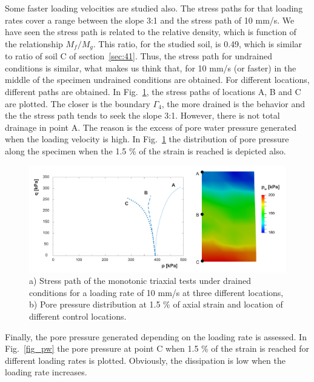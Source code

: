 \documentclass[preprint,12pt,a4paper]{elsarticle}
\begin{document}
Some faster loading velocities are studied also. The stress paths for that loading rates cover a range between the slope 3:1 and the stress path of 10 mm/s. We have seen the stress path is related to the relative density, which is function of the relationship $M_f/M_g$. This ratio, for the studied soil, is 0.49, which is similar to ratio of soil C of section~\ref{sec:41}. Thus, the stress path for undrained conditions is similar, what makes us think that, for 10 mm/s (or faster) in the middle of the specimen undrained conditions are obtained. For different locations, different paths are obtained. In Fig.~\ref{fig_drained_abc}, the stress paths of locations A, B and C are plotted. The closer is the boundary  $\Gamma_4$, the more drained is the behavior and the the stress path tends to seek the slope 3:1. However, there is not total drainage in point A. The reason is the excess of pore water pressure generated when the loading velocity is high. In Fig.~\ref{fig_drained_abc} the distribution of pore pressure along the specimen when the 1.5 \% of the strain is reached is depicted also.

\begin{figure}
\centering
\includegraphics[width=1.01\textwidth]{Figs/drained_abc.pdf}
\caption{a) Stress path of the monotonic triaxial tests under drained conditions for a loading rate of 10 mm/s at three different locations, b) Pore pressure distribution at 1.5 \% of axial strain and location of different control locations.}
\label{fig_drained_abc}
\end{figure}

Finally, the pore pressure generated depending on the loading rate is assessed. In Fig.~\ref{fig_pw} the pore pressure at point C when 1.5 \% of the strain is reached for different loading rates is plotted. Obviously, the dissipation is low when the loading rate increases.
\end{document}
